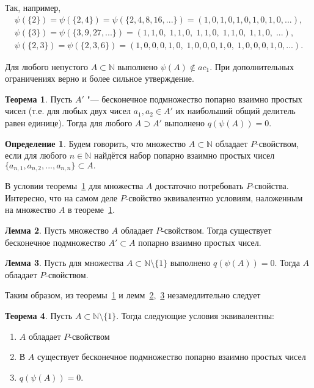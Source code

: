 \documentclass[a4paper,openbib]{article}
\theoremstyle{definition}
\newtheorem{lemma}{Лемма}
\newtheorem{theorem}[lemma]{Теорема}
\newtheorem{definition}{Определение}
\begin{document}
Так, например,
\begin{gather*}
	\psi(\{2\}) = \psi(\{2, 4\}) = \psi(\{2,4,8,16,...\}) = (1,0,1,0,1,0,1,0,1,0,...),
\\
	\psi(\{3\}) = \psi(\{3,9,27,...\}) = (1,1,0,\;1,1,0,\;1,1,0,\;1,1,0,\;1,1,0,\;...),
\\
	\psi(\{2,3\}) = \psi(\{2,3,6\}) = (1,0,0,0,1,0,\;1,0,0,0,1,0,\;1,0,0,0,1,0,...).
\end{gather*}


Для любого непустого $A\subset \mathbb{N} $ выполнено $\psi(A) \notin ac_1$.
При дополнительных ограничениях верно и более сильное утверждение.

\begin{theorem}
	\label{lem:ac0_primes_infinity_mutually_prime_subset}
	Пусть $A'$ "--- бесконечное подмножество попарно взаимно простых чисел
	(т.е. для любых двух чисел $a_1, a_2 \in A'$ их наибольший общий делитель равен единице).
	Тогда для любого $A \supset A' $ выполнено $q(\psi(A))=0$.
\end{theorem}

\begin{definition}
	Будем говорить, что множество $A\subset\mathbb{N}$ обладает $P$-свойством,
	если для любого $n\in\mathbb{N}$ найдётся набор попарно взаимно простых чисел
	$
		\{a_{n,1}, a_{n,2}, ..., a_{n,n}  \} \subset A
		.
	$
\end{definition}

В условии теоремы~\ref{lem:ac0_primes_infinity_mutually_prime_subset}
для множества $A$ достаточно потребовать $P$-свойства.
Интересно, что на самом деле $P$-свойство эквивалентно условиям,
наложенным на множество $A$ в теореме~\ref{lem:ac0_primes_infinity_mutually_prime_subset}.

\begin{lemma}
	\label{lem:ac0_primes_infinity_mutually_prime_subset_equiv_to_P_property}
	Пусть множество $A$ обладает $P$-свойством.
	Тогда существует бесконечное подмножество $A'\subset A$ попарно взаимно простых чисел.
\end{lemma}


\begin{lemma}
	\label{lem:ac0_primes_q_psi_A_0_causes_P}
	Пусть для множества $A\subset\mathbb{N}\setminus\{1\}$ выполнено $q(\psi(A))=0$.
	Тогда $A$ обладает $P$-свойством.
\end{lemma}


Таким образом,
из теоремы~\ref{lem:ac0_primes_infinity_mutually_prime_subset}
и лемм~\ref{lem:ac0_primes_infinity_mutually_prime_subset_equiv_to_P_property},~\ref{lem:ac0_primes_q_psi_A_0_causes_P}
незамедлительно следует
\begin{theorem}
	Пусть $A\subset \mathbb{N}\setminus\{1\}$.
	Тогда следующие условия эквивалентны:
	\begin{enumerate}[label=(\roman*)]
		\item
			$A$ обладает $P$-свойством
		\item
			В $A$ существует бесконечное подмножество попарно взаимно простых чисел
		\item
			$q(\psi(A))=0$.
	\end{enumerate}
\end{theorem}
\end{document}
